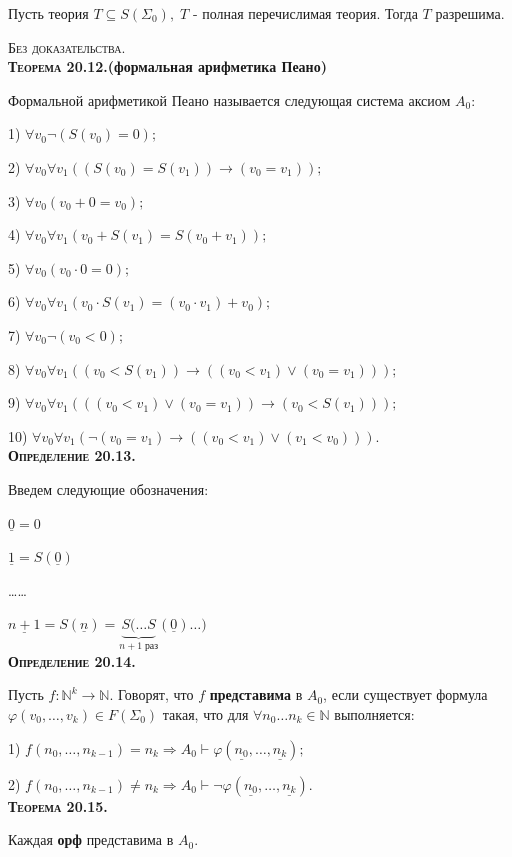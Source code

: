 \documentclass[18pt, a4paper]{extarticle}
\newcommand{\opred}[1]{\textbf{\textsc{Определение #1}}}
\newcommand{\teor}[1]{\textbf{\textsc{Теорема #1}}}
\newcommand{\vp}{\varphi}
\newcommand{\vd}{\vdash}
\newcommand{\bezdok}{\textsc{Без доказательства.}}
\begin{document}
Пусть теория $T\subseteq S(\Sigma_0),\;T$ - полная перечислимая теория. Тогда $T$ разрешима.

\bezdok\\

\teor{20.12.}\textbf{(формальная арифметика Пеано)} 

Формальной арифметикой Пеано называется следующая система аксиом $A_0$:

1) $\forall v_0\lnot(S(v_0)=0);$

2) $\forall v_0\forall v_1((S(v_0)=S(v_1))\to(v_0=v_1));$

3) $\forall v_0(v_0+0=v_0);$

4) $\forall v_0\forall v_1(v_0+S(v_1)=S(v_0+v_1));$

5) $\forall v_0(v_0\cdot0=0);$

6) $\forall v_0\forall v_1(v_0\cdot S(v_1)=(v_0\cdot v_1) + v_0);$

7) $\forall v_0\lnot(v_0<0);$

8) $\forall v_0\forall v_1((v_0<S(v_1))\to((v_0<v_1)\vee(v_0=v_1)));$

9) $\forall v_0\forall v_1(((v_0<v_1)\vee(v_0=v_1))\to(v_0<S(v_1)));$

10) $\forall v_0\forall v_1(\lnot(v_0=v_1)\to((v_0<v_1)\vee(v_1<v_0)))$.\\

\opred{20.13.} 

Введем следующие обозначения:

$\underline{0}=0$

$\underline{1}=S(\underline{0})$

\dots\dots

$\underline{n+1}=S(\underline{n})=\underset{n+1\;\text{раз}}{\underbrace{S(\dots S}}(\underline{0})\dots)$\\

\opred{20.14.} 

Пусть $f:\mathbb N^k\to \mathbb N$. Говорят, что $f$ \textbf{представима} в $A_0$, если существует формула $\vp(v_0,\dots,v_k)\in F(\Sigma_0)$ такая, что для $\forall n_0\dots n_k\in\mathbb N$ выполняется:

1) $f(n_0,\dots,n_{k-1})=n_k\Rightarrow A_0\vd\vp(\underline{n_0},\dots,\underline{n_k});$

2) $f(n_0,\dots,n_{k-1})\neq n_k\Rightarrow A_0\vd\lnot\vp(\underline{n_0},\dots,\underline{n_k})$.\\

\teor{20.15.} 

Каждая \textbf{орф} представима в $A_0$.
\end{document}
